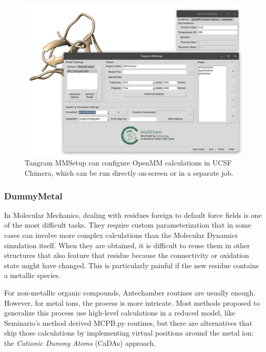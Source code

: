 \begin{figure}
	\begin{Center}
		\includegraphics[width=\textwidth]{./figures/05/tangram_mm.png}
	\end{Center}
	\caption[Tangram MMSetup]{Tangram MMSetup can configure OpenMM calculations in UCSF Chimera, which can be run directly on-screen or in a separate job.}
	\label{fig:tangram-mmsetup}
\end{figure}


\subsubsection{DummyMetal}
In Molecular Mechanics, dealing with residues foreign to default force fields is one of the most difficult tasks. They require custom parameterization that in some cases can involve more complex calculations than the Molecular Dynamics simulation itself. When they are obtained, it is difficult to reuse them in other structures that also feature that residue because the connectivity or oxidation state might have changed. This is particularly painful if the new residue contains a metallic species.

For non-metallic organic compounds, Antechamber\cite{wang2001antechamber} routines are usually enough. However, for metal ions, the process is more intricate. Most methods proposed to generalize this process use high-level calculations in a reduced model, like Seminario's method derived MCPB.py routines,\cite{mcpbpy} but there are alternatives that skip those calculations by implementing virtual positions around the metal ion: the \textit{Cationic Dummy Atoms} (CaDAs) approach.\cite{duarte2014}

